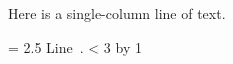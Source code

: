 \ifx\undefined\eplain  \fi

%

Here is a single-column line of text.
 
\doublecolumns
\newcount \xxx
{}
\par
\baselineskip = 2.5\baselineskip
\loop
	\hbox{Line \the\xxx.}
	\ifnum \xxx < 3
	\advance \xxx by 1
\repeat
 
\bye
